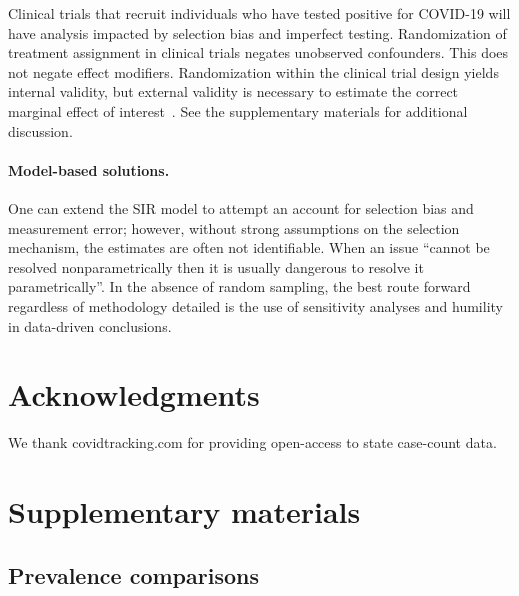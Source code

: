 \documentclass[12pt]{article}
\begin{document}
Clinical trials that recruit individuals who have tested positive for COVID-19 will have analysis impacted by selection bias and imperfect testing. Randomization of treatment assignment in clinical trials negates unobserved confounders.  This does not negate effect modifiers.  Randomization within the clinical trial design yields internal validity, but external validity is necessary to estimate the correct marginal effect of interest~\cite{Keiding2016}. See the supplementary materials for additional discussion.

\paragraph*{Model-based solutions.}

One can extend the SIR model to attempt an account for selection bias and measurement error; however, without strong assumptions on the selection mechanism, the estimates are often not identifiable.  When an issue ``cannot be resolved nonparametrically then it is usually dangerous to resolve it parametrically''\cite{CoxHink74}. In the absence of random sampling, the best route forward regardless of methodology detailed is the use of sensitivity analyses and humility in data-driven conclusions.

% 






\section*{Acknowledgments}
We thank covidtracking.com for providing open-access to state case-count data.

\section*{Supplementary materials}


\subsection*{Prevalence comparisons}
\end{document}
